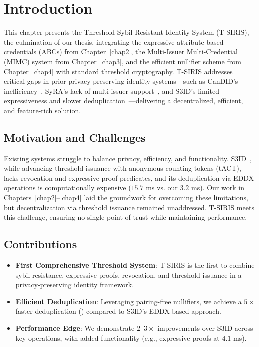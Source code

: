 \label{chap6}

\section{Introduction}\label{sec:threshold-intro}

This chapter presents the Threshold Sybil-Resistant Identity System (T-SIRIS), the culmination of our thesis, integrating the expressive attribute-based credentials (ABCs) from Chapter~\ref{chap2}, the Multi-Issuer Multi-Credential (MIMC) system from Chapter~\ref{chap3}, and the efficient nullifier scheme from Chapter~\ref{chap4} with standard threshold cryptography. T-SIRIS addresses critical gaps in prior privacy-preserving identity systems—such as CanDID's inefficiency~\cite{maram2021candid}, SyRA's lack of multi-issuer support~\cite{crites_syra_2024}, and S3ID's limited expressiveness and slower deduplication~\cite{rabaninejad_attribute-based_2024}—delivering a decentralized, efficient, and feature-rich solution.

\subsection{Motivation and Challenges}

Existing systems struggle to balance privacy, efficiency, and functionality. S3ID~\cite{rabaninejad_attribute-based_2024}, while advancing threshold issuance with anonymous counting tokens (tACT), lacks revocation and expressive proof predicates, and its deduplication via EDDX operations is computationally expensive ($15.7$ ms vs. our $3.2$ ms). Our work in Chapters~\ref{chap2}–\ref{chap4} laid the groundwork for overcoming these limitations, but decentralization via threshold issuance remained unaddressed. T-SIRIS meets this challenge, ensuring no single point of trust while maintaining performance.

\subsection{Contributions}

\begin{itemize}
    \item \textbf{First Comprehensive Threshold System}: T-SIRIS is the first to combine sybil resistance, expressive proofs, revocation, and threshold issuance in a privacy-preserving identity framework.
    \item \textbf{Efficient Deduplication}: Leveraging pairing-free nullifiers, we achieve a $5\times$ faster deduplication () compared to S3ID's EDDX-based approach.
    \item \textbf{Performance Edge}: We demonstrate $2$–$3\times$ improvements over S3ID across key operations, with added functionality (e.g., expressive proofs at $4.1$ ms).
\end{itemize}

